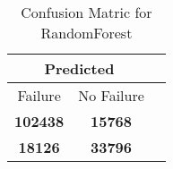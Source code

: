 \begin{table}[] 
\label{Table: Prediction Accuracy-DMDRandomForestOnlySunEKF-combinationReflection-Reflection} 
\caption{Confusion Matric for RandomForest} 
\centering 
\begin{tabular} 
 {@{}ccc@{}} 
\toprule 
\multicolumn{2}{c}{\textbf{Predicted}}
 \\ \midrule 
\multicolumn{1}{|c|}{Failure} & 
\multicolumn{1}{c|}{No Failure}
 \\ \midrule 
\multicolumn{1}{|c|}{\color{green}\textbf{102438}} & 
\multicolumn{1}{c|}{\color{red}\textbf{15768}}
 \\ \midrule 
\multicolumn{1}{|c|}{\color{red}\textbf{18126}} & 
\multicolumn{1}{c|}{\color{green}\textbf{33796}}
 \\ \bottomrule 
\end{tabular} 
\end{table} 
